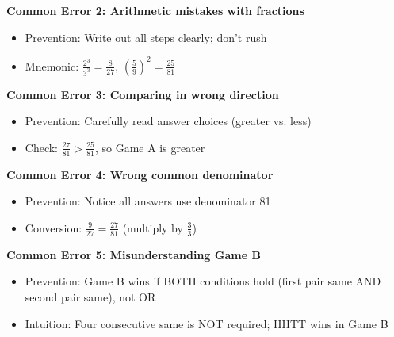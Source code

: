 \documentclass[]{article}
\begin{document}
\begin{solutionbox}
\textbf{Common Error 2: Arithmetic mistakes with fractions}
\begin{itemize}[leftmargin=*]
    \item Prevention: Write out all steps clearly; don't rush
    \item Mnemonic: $\frac{2^3}{3^3} = \frac{8}{27}$, $\left(\frac{5}{9}\right)^2 = \frac{25}{81}$
\end{itemize}

\textbf{Common Error 3: Comparing in wrong direction}
\begin{itemize}[leftmargin=*]
    \item Prevention: Carefully read answer choices (greater vs. less)
    \item Check: $\frac{27}{81} > \frac{25}{81}$, so Game A is greater
\end{itemize}

\textbf{Common Error 4: Wrong common denominator}
\begin{itemize}[leftmargin=*]
    \item Prevention: Notice all answers use denominator 81
    \item Conversion: $\frac{9}{27} = \frac{27}{81}$ (multiply by $\frac{3}{3}$)
\end{itemize}

\textbf{Common Error 5: Misunderstanding Game B}
\begin{itemize}[leftmargin=*]
    \item Prevention: Game B wins if BOTH conditions hold (first pair same AND second pair same), not OR
    \item Intuition: Four consecutive same is NOT required; HHTT wins in Game B
\end{itemize}
\end{solutionbox}
\end{document}
